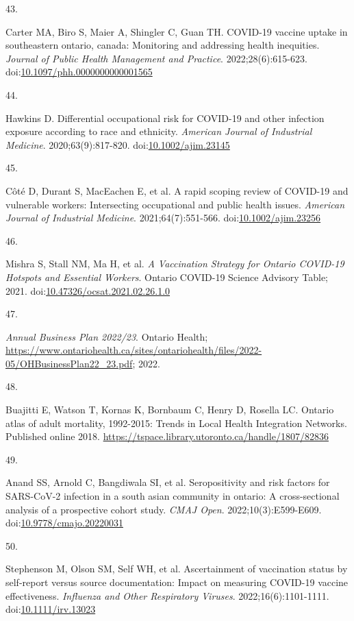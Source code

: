 \documentclass[
  letterpaper,
  DIV=11,
  numbers=noendperiod]{scrartcl}
\newlength{\cslhangindent}
\newlength{\csllabelwidth}
\newlength{\cslentryspacingunit} %
\newenvironment{CSLReferences}[2] %
 {%
  \setlength{\parindent}{0pt}
  \ifodd #1
  \let\oldpar\par
  \def\par{\hangindent=\cslhangindent\oldpar}
  \fi
  \setlength{\parskip}{#2\cslentryspacingunit}
 }%
 {}
\newcommand{\CSLLeftMargin}[1]{\parbox[t]{\csllabelwidth}{#1}}
\newcommand{\CSLRightInline}[1]{\parbox[t]{\linewidth - \csllabelwidth}{#1}\break}
\begin{document}
\begin{CSLReferences}{0}{0}
\leavevmode{}%
\CSLLeftMargin{43. }%
\CSLRightInline{Carter MA, Biro S, Maier A, Shingler C, Guan TH.
{COVID}-19 vaccine uptake in southeastern ontario, canada: Monitoring
and addressing health inequities. \emph{Journal of Public Health
Management and Practice}. 2022;28(6):615-623.
doi:\href{https://doi.org/10.1097/phh.0000000000001565}{10.1097/phh.0000000000001565}}

\leavevmode{}%
\CSLLeftMargin{44. }%
\CSLRightInline{Hawkins D. Differential occupational risk for {COVID}-19
and other infection exposure according to race and ethnicity.
\emph{American Journal of Industrial Medicine}. 2020;63(9):817-820.
doi:\href{https://doi.org/10.1002/ajim.23145}{10.1002/ajim.23145}}

\leavevmode{}%
\CSLLeftMargin{45. }%
\CSLRightInline{Côté D, Durant S, MacEachen E, et al. A rapid scoping
review of {COVID}-19 and vulnerable workers: Intersecting occupational
and public health issues. \emph{American Journal of Industrial
Medicine}. 2021;64(7):551-566.
doi:\href{https://doi.org/10.1002/ajim.23256}{10.1002/ajim.23256}}

\leavevmode{}%
\CSLLeftMargin{46. }%
\CSLRightInline{Mishra S, Stall NM, Ma H, et al. \emph{A Vaccination
Strategy for Ontario {COVID}-19 Hotspots and Essential Workers}. Ontario
{COVID}-19 Science Advisory Table; 2021.
doi:\href{https://doi.org/10.47326/ocsat.2021.02.26.1.0}{10.47326/ocsat.2021.02.26.1.0}}

\leavevmode{}%
\CSLLeftMargin{47. }%
\CSLRightInline{\emph{{A}nnual {B}usiness {P}lan 2022/23}. Ontario
Health;
\url{https://www.ontariohealth.ca/sites/ontariohealth/files/2022-05/OHBusinessPlan22_23.pdf};
2022.}

\leavevmode{}%
\CSLLeftMargin{48. }%
\CSLRightInline{Buajitti E, Watson T, Kornas K, Bornbaum C, Henry D,
Rosella LC. Ontario atlas of adult mortality, 1992-2015: Trends in
{L}ocal {H}ealth {I}ntegration {N}etworks. Published online 2018.
\url{https://tspace.library.utoronto.ca/handle/1807/82836}}

\leavevmode{}%
\CSLLeftMargin{49. }%
\CSLRightInline{Anand SS, Arnold C, Bangdiwala SI, et al. Seropositivity
and risk factors for {SARS}-{CoV}-2 infection in a south asian community
in ontario: A cross-sectional analysis of a prospective cohort study.
\emph{{CMAJ} Open}. 2022;10(3):E599-E609.
doi:\href{https://doi.org/10.9778/cmajo.20220031}{10.9778/cmajo.20220031}}

\leavevmode{}%
\CSLLeftMargin{50. }%
\CSLRightInline{Stephenson M, Olson SM, Self WH, et al. Ascertainment of
vaccination status by self-report versus source documentation: Impact on
measuring {COVID}-19 vaccine effectiveness. \emph{Influenza and Other
Respiratory Viruses}. 2022;16(6):1101-1111.
doi:\href{https://doi.org/10.1111/irv.13023}{10.1111/irv.13023}}

\end{CSLReferences}
\end{document}

